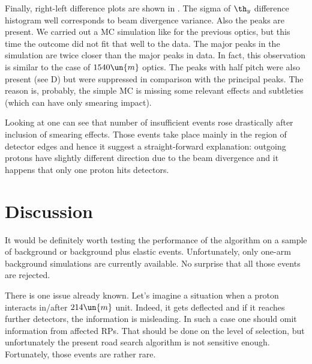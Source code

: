 Finally, right-left difference plots are shown in . The sigma of $\th_y$ difference histogram well corresponds to beam divergence variance. Also the peaks are present. We carried out a MC simulation like for the previous optics, but this time the outcome did not fit that well to the data. The major peaks in the simulation are twice closer than the major peaks in data. In fact, this observation is similar to the case of $1540\un{m}$ optics. The peaks with half pitch were also present (see D) but were suppressed in comparison with the principal peaks. The reason is, probably, the simple MC is missing some relevant effects and subtleties (which can have only smearing impact). 

Looking at  one can see that number of insufficient events rose drastically after inclusion of smearing effects. Those events take place mainly in the region of detector edges and hence it suggest a straight-forward explanation: outgoing protons have slightly different direction due to the beam divergence and it happens that only one proton hits detectors.



\section[disc]{Discussion}

It would be definitely worth testing the performance of the algorithm on a sample of background or background plus elastic events. Unfortunately, only one-arm background simulations are currently available. No surprise that all those events are rejected.

There is one issue already known. Let's imagine a situation when a proton interacts in/after $214\un{m}$ unit. Indeed, it gets deflected and if it reaches further detectors, the information is misleading. In such a case one should omit information from affected RPs. That should be done on the level of selection, but unfortunately the present road search algorithm is not sensitive enough. Fortunately, those events are rather rare.

\iffalse
In order to avoid those problems, it is necessary to improve the selection algorithm. Instead of road search algorithm, one can use a proper pattern recognition algorithm with pattern defined by \Eq{track general}. This can be implemented on the level of elastic reconstruction or better a lever lower. Instead of (current) selecting hits RP by RP, this might be done using all hits available. This might be very useful in the case a detector has more than one hit. Using information from other detectors, one may remove the ambiguity in pairing $u$ and $v$ strips. This needs to be discussed.
\fi


